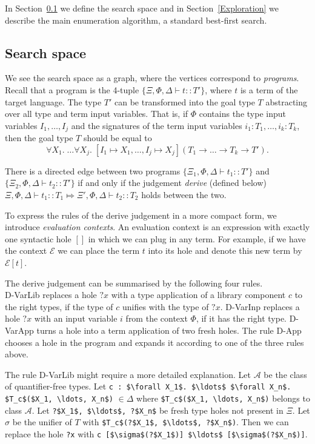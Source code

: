 In Section~\ref{Search space} we define the search space and in Section~\ref{Exploration} we describe the main enumeration algorithm, a standard best-first search.

\subsection{Search space}\label{Search space}
We see the search space as a graph, where the vertices correspond to \emph{programs}. Recall that a program is the 4-tuple $\{\Xi, \Phi, \Delta \vdash t :: T'\}$, where $t$ is a term of the target language. The type $T'$ can be transformed into the goal type $T$ abstracting over all type and term input variables. That is, if $\Phi$ contains the type input variables $I_1, \ldots, I_j$ and the signatures of the term input variables $i_1 : T_1, \ldots, i_k : T_k$, then the goal type $T$ should be equal to
\[\forall X_1.\; \ldots \forall X_j.\; [I_1 \mapsto X_1, \ldots, I_j \mapsto X_j] (T_1 \rightarrow \ldots \rightarrow T_k \rightarrow T').\]

There is a directed edge between two programs $\{\Xi_1, \Phi, \Delta \vdash t_1 :: T'\}$ and $\{\Xi_2, \Phi, \Delta \vdash t_2 :: T'\}$ if and only if the judgement \emph{derive} (defined below) $\Xi, \Phi, \Delta \vdash t_1 :: T_1 \Mapsto \Xi', \Phi, \Delta \vdash t_2 :: T_2$ holds between the two.

To express the rules of the derive judgement in a more compact form, we introduce \emph{evaluation contexts}. An evaluation context is an expression with exactly one syntactic hole $[]$ in which we can plug in any term. For example, if we have the context $\mathcal{E}$ we can place the term $t$ into its hole and denote this new term by $\mathcal{E}[t]$.

The derive judgement can be summarised by the following four rules.\\
D-VarLib replaces a hole $?x$ with a type application of a library component $c$ to the right types, if the type of $c$ unifies with the type of $?x$. D-VarInp replaces a hole $?x$ with an input variable $i$ from the context $\Phi$, if it has the right type. D-VarApp turns a hole into a term application of two fresh holes. The rule D-App chooses a hole in the program and expands it according to one of the three rules above.

The rule D-VarLib might require a more detailed explanation.
Let $\mathcal{A}$ be the class of quantifier-free types. Let \lstinline?c : $\forall X_1$. $\ldots$ $\forall X_n$. $T_c$($X_1, \ldots, X_n$)? $\in \Delta$ where \lstinline?$T_c$($X_1, \ldots, X_n$)? belongs to class $\mathcal{A}$. Let \lstinline!?$X_1$, $\ldots$, ?$X_n$! be fresh type holes not present in $\Xi$. Let $\sigma$ be the unifier of $T$ with \lstinline!$T_c$(?$X_1$, $\ldots$, ?$X_n$)!. Then we can replace the hole \lstinline!?x! with \lstinline!c [$\sigma$(?$X_1$)] $\ldots$ [$\sigma$(?$X_n$)]!.

